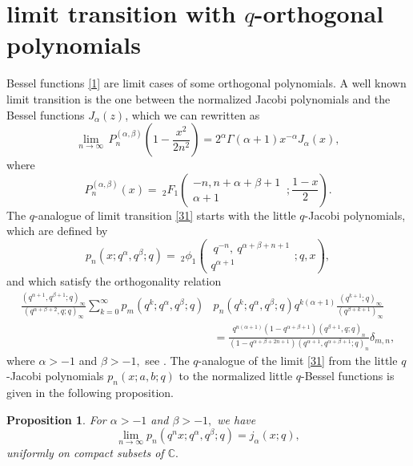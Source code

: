 \documentclass[12pt,a4paper]{amsart}
\numberwithin{equation}{section}
\theoremstyle{plain}
\newtheorem{proposition}[theorem]{Proposition}
\theoremstyle{definition}
\theoremstyle{remark}
\numberwithin{equation}{section}
\numberwithin{table}{section}
\numberwithin{figure}{section}
\begin{document}
\section{limit transition with $q$-orthogonal polynomials}
Bessel functions \eqref{1} are limit cases of some orthogonal
polynomials. A well known limit transition is the one between the
normalized Jacobi polynomials and the Bessel functions
$J_{\alpha}(z)$, which we can rewritten as
\begin{equation}
\lim_{n\rightarrow\infty}\,
P_n^{(\alpha,\beta)}\left(1-\frac{x^2}{2n^2}\right)=2^{\alpha}\Gamma
(\alpha +1)x^{-\alpha}J_{\alpha}(x), \label{31}
\end{equation}
where
\begin{equation}
P_n^{(\alpha,\beta)}(x)=\ _{2}F_1\left(\begin{matrix} -n,n+\alpha+\beta+1 \\
\alpha+1\end{matrix}\,;\frac{1-x}{2}\right)\label{32}.
\end{equation}
The $q$-analogue of limit transition \eqref{31} starts with the
little $q$-Jacobi polynomials, which are defined by
\begin{equation}
p_n(x;q^{\alpha},q^{\beta};q)=\ _{2}\phi_1\left(\begin{matrix} \
q^{-n}, \
q^{\alpha+\beta+n+1} \\
q^{\alpha+1}\end{matrix};q,x\right) \label{33},
\end{equation}
and which satisfy the orthogonality relation
\begin{align*}
\frac{(q^{\alpha+1},q^{\beta+1};q)_{\infty}}{(q^{\alpha+\beta+2},q;q)_{\infty}}\sum_{k=0}^{\infty}
p_m(q^k;q^{\alpha},q^{\beta};q)&p_n(q^k;q^{\alpha},q^{\beta};q)q^{k(\alpha+1)}\frac{(q^{k+1};q)_{\infty}}{(q^{\beta+k+1})_{\infty}}\\&=
\frac{q^{n(\alpha+1)}(1-q^{\alpha+\beta+1})(q^{\beta+1},q;q)_n}{(1-q^{\alpha+\beta+2n+1})(q^{\alpha+1},q^{\alpha+\beta+1};q)_{n}}\delta_{m,n},
\end{align*}
where $\alpha >-1$ and $\beta>-1,$ see \cite{Sheme}. The
$q$-analogue of the limit \eqref{31} from the little $q$-Jacobi
polynomials $p_n(x;a,b;q)$ to the normalized little $q$-Bessel
functions is given in the following proposition.
\begin{proposition} For $\alpha>-1$ and $\beta>-1,$ we have
\begin{equation}
\lim_{n \rightarrow
\infty}p_n(q^nx;q^{\alpha},q^{\beta};q)=j_{\alpha}(x;q),
\end{equation}
uniformly on compact subsets of $\mathbb{C}.$
\end{proposition}
\end{document}
